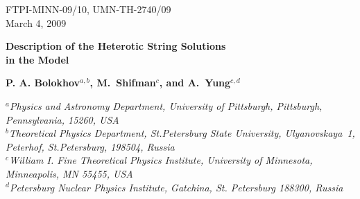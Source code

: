 \documentclass[12pt]{article}
\newcommand{\ntwo}{${\mathcal N}=2$ }
\newcommand{\ntwot}{${\mathcal N}= \left(2,2\right) $ }
\newcommand{\ntwoo}{${\mathcal N}= \left(0,2\right) $ }
\newcommand{\none}{${\mathcal N}=1$ }
\begin{document}
\begin{titlepage}

\begin{flushright}
FTPI-MINN-09/10, UMN-TH-2740/09\\
March 4, 2009
\end{flushright}

\begin{center}

{\Large \bf   Description of the Heterotic String Solutions
\\[2mm]
 in the  Model }
\end{center}

\begin{center}
{\bf P. A. Bolokhov$^{a,b}$, M.~Shifman$^{c}$, and \bf A.~Yung$^{c,d}$}
\end {center}
\vspace{0.3cm}
\begin{center}

$^a${\it Physics and Astronomy Department, University of Pittsburgh, Pittsburgh, Pennsylvania, 15260, USA}\\
$^b${\it Theoretical Physics Department, St.Petersburg State University, Ulyanovskaya~1, 
	 Peterhof, St.Petersburg, 198504, Russia}\\
$^c${\it  William I. Fine Theoretical Physics Institute,
University of Minnesota,
Minneapolis, MN 55455, USA}\\
$^{d}${\it Petersburg Nuclear Physics Institute, Gatchina, St. Petersburg
188300, Russia}\\

\end{center}

\begin{abstract}

We continue the  study of heterotic non-Abelian BPS-saturated flux tubes (strings).
Previously, such solutions were obtained  in  U($N$) gauge theories:
 \ntwo super\-symmetric QCD deformed by
superpotential terms $\mu{\mathcal A}^2$ breaking
\ntwo supersymmetry down to \none$\!\!$. 
In these models one cannot consider the limit $\mu\to\infty$
which would eliminate adjoint fields: the bulk theory develops a Higgs
branch; the emergence of massless particles in the bulk
precludes one from taking the  limit $\mu\to\infty$.
This drawback is absent in the $M$ model (hep-th/0701040)
where the matter sector includes additional ``meson"
fields $M$ introduced in a special way.
We generalize our previous results 
to the $M$ model, derive the
 heterotic string (the 
 string world-sheet theory is
 a heterotic \ntwoo 
sigma model, with the CP$(N-1)$ target space for bosonic fields and an extra 
right-handed fermion coupled to the fermion fields of the
\ntwot CP$(N-1)$ model),
 and then explicitly obtain all relevant zero modes.
This allows us to relate parameters of the
microscopic $M$ model to those of  the world-sheet theory.  
The limit $\mu\to\infty$ is perfectly smooth.
Thus, the full-blown and fully analyzed heterotic string emerges, for the first time, in
the \none theory with no adjoint fields. The fate of the confined monopoles is discussed.


\end{abstract}
\end{titlepage}
\end{document}
